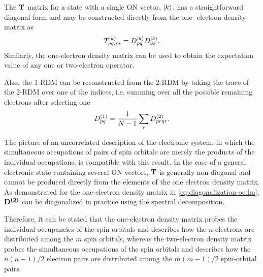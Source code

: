 The $ \mat{T}$ matrix for a state with a single ON vector, $\Ket{k}$, has a 
straightforward diagonal form and may be constructed directly from the one-
electron density matrix as
\begin{equation} \label{eq:T_from_D1s}
    T_{pq,rs}^{\Ket{k}} = D_{pq}^{\Ket{k}} D_{qs}^{\Ket{k}}
    .
\end{equation}
Similarly, the one-electron density matrix can be used to obtain the 
expectation value of any one or two-electron operator.

Also, the 1-RDM can be reconstructed from the 2-RDM by taking the trace of the
2-RDM over one of the indices, i.e. summing over all the possible remaining
electrons after selecting one 
\begin{equation} \label{eq:1rdm-from-2rdm}
    \oedm_{pq} =
    \frac{1}{N-1} \sum_{r} \tedm_{prqr}
    .
\end{equation}

The picture of an uncorrelated description of the electronic system, in which 
the simultaneous occupations of pairs of spin orbitals are merely the products 
of the individual occupations, is compatible with this result.
In the case of a general electronic state containing several ON vectors, $\mat{T}$
is generally non-diagonal and cannot be produced directly from the elements of 
the one electron density matrix. As demonstrated for the one-electron density 
matrix in \cref{eq:diagonalization-oedm}, $ \mat{\tedm}$ can be diagonalized
in practice using the spectral decomposition.

Therefore, it can be stated that the one-electron density matrix probes the
individual occupancies of the spin orbitals and describes how the $n$ electrons
are distributed among the $m$ spin orbitals, whereas the two-electron density
matrix probes the simultaneous occupations of the spin orbitals and describes
how the $n\left( n-1 \right) /2$ electron pairs are distributed among the 
$m\left( m-1 \right) /2$ spin-orbital pairs.

